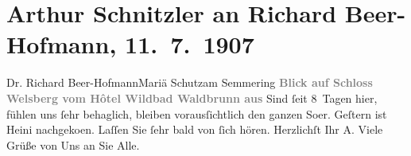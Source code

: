 

         
         \renewcommand{\erwaehntePersonen}{Personen: Richard Beer-Hofmann, Heinrich Schnitzler}
         \renewcommand{\erwaehnteOrte}{Orte: Maria Schutz, Schloss Welsperg, Semmering, Welsberg-Taisten, Wildbad Waldbrunn}
         \renewcommand{\erwaehnteWerke}{}
               \section[Arthur Schnitzler an Richard Beer-Hofmann, 11. 7. 1907]{ Arthur Schnitzler an Richard Beer-Hofmann, 11. 7. 1907}\nopagebreak{}\rehead{ }\begin{ledgroupsized}[t]{13cm}\normalsize\beginnumbering \toendnotes[C]{\smallbreak\pagebreak[2]} 
\pstart{}{\pb}Dr. Richard Beer-Hofmann\pend{}\pstart{}Mariä Schutz\pend{}\pstart{}am Semmering\pend{}{\bigskip}\pstart
           \noindent{}\centering{}{\pb}\textcolor{gray}{\textbf{Blick auf Schloss
                        Welsberg vom Hôtel Wildbad
                        Waldbrunn aus}}\pend
           \pstart
           Sind ſeit 8 Tagen hier, fühlen uns ſehr behaglich, bleiben vorausſichtlich den ganzen
                  So{\geminationm}er. Geſtern ist Heini nachgeko{\geminationm}en.\pend
           \pstart
           Laſſen Sie ſehr bald von ſich hören.\pend
           \pstart Herzlichſt Ihr \spacefill\mbox{A.}\pend{}\pstart
           \noindent{}Viele Grüße von Uns an Sie Alle.\pend
           
         
         \endnumbering{}\end{ledgroupsized}  \newcommand{\dateiname}{L01689}\newcommand{\titel}{Arthur Schnitzler an Richard Beer-Hofmann, 11. 7. 1907}\newcommand{\editorInnen}{Martin Anton Müller und Gerd-Hermann Susen}
      